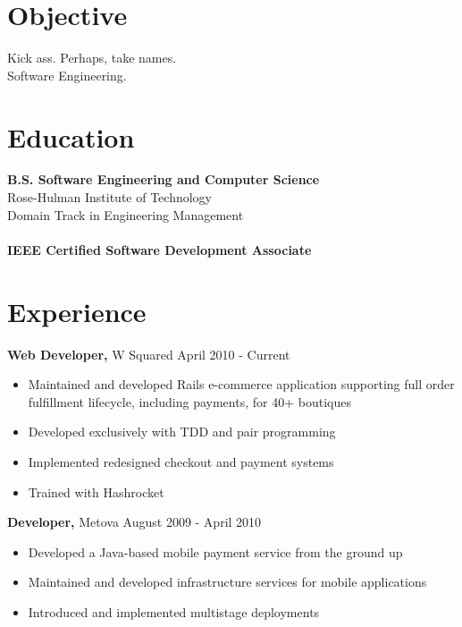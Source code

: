 \documentclass[line, margin, 10pt]{res}
\begin{document}
 

\renewcommand{\namefont}{ \LARGE \bf }

\address{elizabrock@gmail.com}
\address{(858) 205-9285}
 
\begin{resume} 
\section{Objective} 
Kick ass. Perhaps, take names. \\
Software Engineering.

\section{Education} 
{\bf B.S. Software Engineering and Computer Science}\\
Rose-Hulman Institute of Technology\\
Domain Track in Engineering Management \\
\\
{\bf IEEE Certified Software Development Associate}
\section{Experience}
 {\bf Web Developer,} W Squared \hfill April 2010 - Current
 \begin{itemize} \itemsep -2pt  %
 \item Maintained and developed Rails e-commerce application supporting full order fulfillment lifecycle, including payments, for 40+ boutiques
 \item Developed exclusively with TDD and pair programming
 \item Implemented redesigned checkout and payment systems
 \item Trained with Hashrocket
 \end{itemize}

 {\bf Developer,} Metova  \hfill August 2009 - April 2010
 \begin{itemize} \itemsep -2pt  %
 \item Developed a Java-based mobile payment service from the ground up
 \item Maintained and developed infrastructure services for mobile applications
 \item Introduced and implemented multistage deployments
 \end{itemize}


\end{resume}
\end{document}
